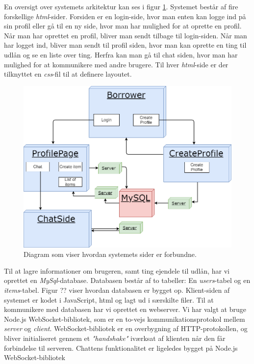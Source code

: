 En oversigt over systemets arkitektur kan ses i figur \ref{fig:OverordnetArkitektur}. Systemet består af fire forskellige \textit{html}-sider. Forsiden er en login-side, hvor man enten kan logge ind på sin profil eller gå til en ny side, hvor man har mulighed for at oprette en profil. Når man har oprettet en profil, bliver man sendt tilbage til login-siden.
\newline
\noindent
Når man har logget ind, bliver man sendt til profil siden, hvor man kan oprette en ting til udlån og se en liste over ting. Herfra kan man gå til chat siden, hvor man har mulighed for at kommunikere med andre brugere.
\newline
\noindent
Til hver \textit{html}-side er der tilknyttet en \textit{css}-fil til at definere layoutet.


\begin{figure}[h]

\vspace{-20pt}
  \begin{center}
    \includegraphics[scale=0.5]{Borrower.png}
    \caption{Diagram som viser hvordan systemets sider er forbundne.}
    \label{fig:OverordnetArkitektur}
  \end{center}
  \vspace{-10pt}
  \vspace{-20pt}
\end{figure} 
\noindent
Til at lagre informationer om brugeren, samt ting ejendele til udlån, har vi oprettet en \textit{MySql}-database. Databasen består af to tabeller: En \textit{users}-tabel og en \textit{items}-tabel. Figur ?? viser hvordan databasen er bygget op.
\newline
\noindent
Klient-siden af systemet er kodet i JavaScript, html og lagt ud i særskilte filer.
\newline
\noindent
Til at kommunikere med databasen har vi oprettet en webserver. Vi har valgt at bruge Node.js WebSocket-bibliotek, som er en to-vejs kommunikationsprotokol mellem \textit{server} og \textit{client}. WebSocket-bibliotek er en overbygning af HTTP-protokollen, og bliver initialiseret gennem et \textit{"handshake"} iværksat af klienten når den får forbindelse til serveren. Chattens funktionalitet er ligeledes bygget på Node.js WebSocket-bibliotek

